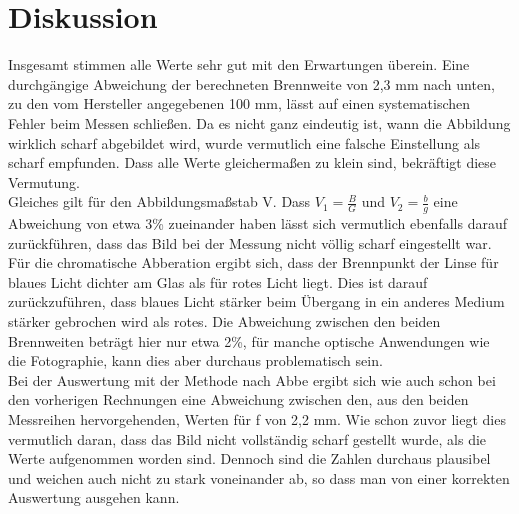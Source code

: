 \section{Diskussion}
Insgesamt stimmen alle Werte sehr gut mit den Erwartungen überein. Eine durchgängige Abweichung der berechneten Brennweite von 2,3 mm nach unten, zu den vom Hersteller angegebenen 100 mm, lässt auf einen systematischen Fehler beim Messen schließen. Da es nicht ganz eindeutig ist, wann die Abbildung wirklich scharf abgebildet wird, wurde vermutlich eine falsche Einstellung als scharf empfunden. Dass alle Werte gleichermaßen zu klein sind, bekräftigt diese Vermutung.\\
Gleiches gilt für den Abbildungsmaßstab V. Dass $V_1 = \frac{B}{G}$ und $V_2 = \frac{b}{g}$ eine Abweichung von etwa 3\% zueinander haben lässt sich vermutlich ebenfalls darauf zurückführen, dass das Bild bei der Messung nicht völlig scharf eingestellt war.\\
Für die chromatische Abberation ergibt sich, dass der Brennpunkt der Linse für blaues Licht dichter am Glas als für rotes Licht liegt. Dies ist darauf zurückzuführen, dass blaues Licht stärker beim Übergang in ein anderes Medium stärker gebrochen wird als rotes. Die Abweichung zwischen den beiden Brennweiten beträgt hier nur etwa 2\%, für manche optische Anwendungen wie die Fotographie, kann dies aber durchaus problematisch sein.\\
Bei der Auswertung mit der Methode nach Abbe ergibt sich wie auch schon bei den vorherigen Rechnungen eine Abweichung zwischen den, aus den beiden Messreihen hervorgehenden, Werten für f von 2,2 mm. Wie schon zuvor liegt dies vermutlich daran, dass das Bild nicht vollständig scharf gestellt wurde, als die Werte aufgenommen worden sind. Dennoch sind die Zahlen durchaus plausibel und weichen auch nicht zu stark voneinander ab, so dass man von einer korrekten Auswertung ausgehen kann.





